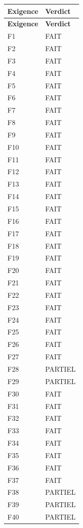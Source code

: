 \documentclass[a4paper]{article}
\begin{document}
\begin{longtable}{|p{}|p{}|}
\hline
\textbf{Exigence} & \textbf{Verdict} \\
\hline
\endfirsthead
\hline
\textbf{Exigence} & \textbf{Verdict} \\
\hline
\endhead
\hline
\endfoot
F1  & FAIT \\
\hline
F2  & FAIT \\
\hline
F3  & FAIT \\
\hline
F4  & FAIT \\
\hline
F5  & FAIT \\
\hline
F6  & FAIT \\
\hline
F7  & FAIT \\
\hline
F8  & FAIT \\
\hline
F9  & FAIT \\
\hline
F10 & FAIT \\
\hline
F11 & FAIT \\
\hline
F12 & FAIT \\
\hline
F13 & FAIT \\
\hline
F14 & FAIT \\
\hline
F15 & FAIT \\
\hline
F16 & FAIT \\
\hline
F17 & FAIT \\
\hline
F18 & FAIT \\
\hline
F19 & FAIT \\
\hline
F20 & FAIT \\
\hline
F21 & FAIT \\
\hline
F22 & FAIT \\
\hline
F23 & FAIT \\
\hline
F24 & FAIT \\
\hline
F25 & FAIT \\
\hline
F26 & FAIT \\
\hline
F27 & FAIT \\
\hline
F28 & PARTIEL \\
\hline
F29 & PARTIEL \\
\hline
F30 & FAIT \\
\hline
F31 & FAIT \\
\hline
F32 & FAIT \\
\hline
F33 & FAIT \\
\hline
F34 & FAIT \\
\hline
F35 & FAIT \\
\hline
F36 & FAIT \\
\hline
F37 & FAIT \\
\hline
F38 & PARTIEL \\
\hline
F39 & PARTIEL \\
\hline
F40 & PARTIEL \\
\hline
\end{longtable}

\normalsize
\end{document}
